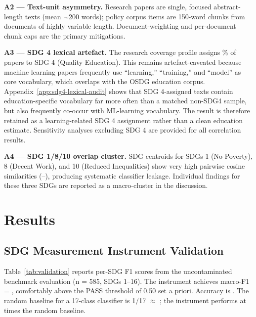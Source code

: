 \documentclass[12pt,a4paper]{article}
\begin{document}
\textbf{A2 --- Text-unit asymmetry.} Research papers are single, focused abstract-length texts (mean $\sim$200 words); policy corpus items are 150-word chunks from documents of highly variable length. Document-weighting and per-document chunk caps are the primary mitigations.

\textbf{A3 --- SDG 4 lexical artefact.}
\label{sec:sdg4artefact}
The research coverage profile assigns \ResearchPctSdgFour\% of papers to SDG 4 (Quality Education). This remains artefact-caveated because machine learning papers frequently use ``learning,'' ``training,'' and ``model'' as core vocabulary, which overlaps with the OSDG education corpus. Appendix~\ref{app:sdg4-lexical-audit} shows that SDG 4-assigned texts contain education-specific vocabulary far more often than a matched non-SDG4 sample, but also frequently co-occur with ML-learning vocabulary. The result is therefore retained as a learning-related SDG 4 assignment rather than a clean education estimate. Sensitivity analyses excluding SDG 4 are provided for all correlation results.

\textbf{A4 --- SDG 1/8/10 overlap cluster.} SDG centroids for SDGs 1 (No Poverty), 8 (Decent Work), and 10 (Reduced Inequalities) show very high pairwise cosine similarities (\CentroidSimOneEightTenMin--\CentroidSimOneEightTenMax), producing systematic classifier leakage. Individual findings for these three SDGs are reported as a macro-cluster in the discussion.

\section{Results}
\label{sec:results}

\subsection{SDG Measurement Instrument Validation}

Table~\ref{tab:validation} reports per-SDG F1 scores from the uncontaminated benchmark evaluation (n = 585, SDGs 1--16). The instrument achieves macro-F1 = \MacroFOne, comfortably above the PASS threshold of 0.50 set a priori. Accuracy is \ValidationAccuracy. The random baseline for a 17-class classifier is 1/17 $\approx$ \RandomBaselineSeventeenClass; the instrument performs at \ValidationVsRandomMultiple{} times the random baseline.

\begin{table}[ht]
\centering
\caption{Per-SDG F1 scores from benchmark validation (SDGs 1--16, n=585, uncontaminated). SDG 17 excluded (contaminated; centroid built from same benchmark texts).}
\label{tab:validation}

\end{table}
\end{document}
